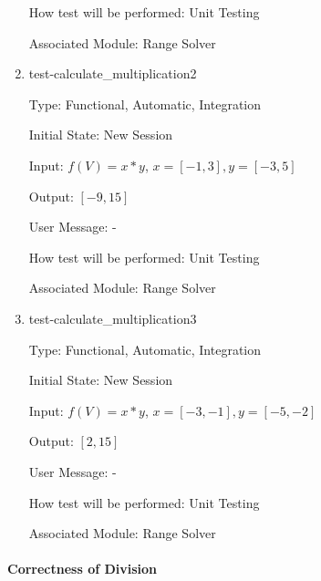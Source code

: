 \documentclass[12pt, titlepage]{article}
\begin{document}
\begin{enumerate}
	How test will be performed: Unit Testing
	
	Associated Module: Range Solver\\
	
	\item{test-calculate\_multiplication2}
	
	Type: Functional, Automatic, Integration
	
	Initial State: New Session
	
	Input: $f(V) = x * y$, $x = [-1,3], y = [-3,5]$
	
	Output: $[-9,15]$
	
	User Message: - 
	
	How test will be performed: Unit Testing
	
	Associated Module: Range Solver\\
	
	\item{test-calculate\_multiplication3}
	
	Type: Functional, Automatic, Integration
	
	Initial State: New Session
	
	Input: $f(V) = x * y$, $x = [-3,-1], y = [-5,-2]$
	
	Output: $[2,15]$
	
	User Message: - 
	
	How test will be performed: Unit Testing
	
	Associated Module: Range Solver\\
	
\end{enumerate}

\paragraph{Correctness of Division}
\end{document}
